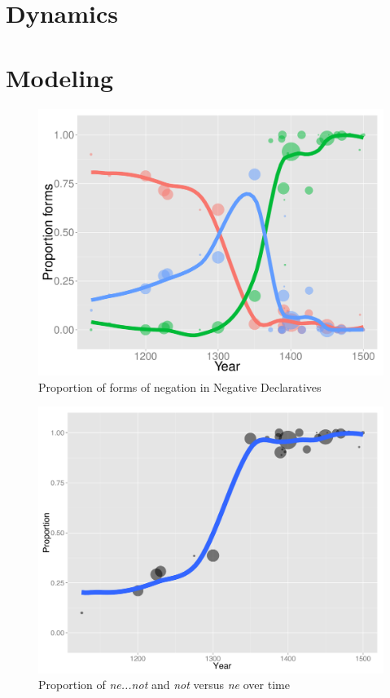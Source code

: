 \documentclass[12pt]{upenndiss}
\theoremstyle{definition} \newtheorem{definition}{Definition}
\begin{document}
\section{Dynamics}

\section{Modeling}

\begin{figure}
\centering
     \includegraphics[width=\textwidth]{neg-year-lines.pdf}
\caption{Proportion of forms of negation in Negative Declaratives}
\label{neg-three-plot}
\end{figure}

\begin{figure}
\centering
     \includegraphics[width=\textwidth]{lump-plot1.pdf}
\caption{Proportion of \textit{\color{blue} ne...not} and \textit{\color{green} not}  versus  \textit{\color{red}  ne} over time}
\label{lump-plot1}
\end{figure}
\end{document}
